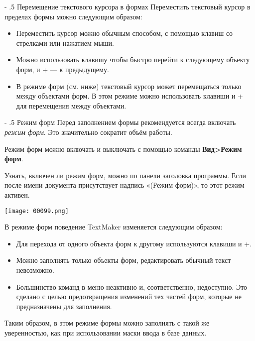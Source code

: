 ﻿\documentclass[a4paper,10pt]{article}
\makeatletter
\renewcommand\paragraph{%
   \@startsection{paragraph}{4}{0mm}%
      {-\baselineskip}%
      {.5\baselineskip}%
      {\normalfont\normalsize\bfseries}}
\makeatother
\begin{document}
\paragraph{Перемещение текстового курсора в формах}
Переместить текстовый курсор в пределах формы можно следующим образом:

\begin{itemize}
 \item Переместить курсор можно обычным способом, с помощью клавиш со стрелками или нажатием мыши.
 \item Можно использовать клавишу  чтобы быстро перейти к следующему объекту форм, и + — к предыдущему.
 \item В режиме форм (см. ниже) текстовый курсор может перемещаться только между объектами форм. В этом режиме можно использовать клавиши  и + для перемещения между объектами.
\end{itemize}

\paragraph{Режим форм}
Перед заполнением формы рекомендуется всегда включать \textit{режим форм}. Это значительно сократит объём работы.

Режим форм можно включать и выключать с помощью команды \textbf{Вид>Режим форм}.

Узнать, включен ли режим форм, можно по панели заголовка программы. Если после имени документа присутствует надпись «(Режим форм)», то этот режим активен.

\texttt{[image: 00099.png]}

В режиме форм поведение TextMaker изменяется следующим образом:
\begin{itemize}
 \item Для перехода от одного объекта форм к другому используются клавиши  и +.
 \item Можно заполнять только объекты форм, редактировать обычный текст невозможно.
 \item Большинство команд в меню неактивно и, соответственно, недоступно. Это сделано с целью предотвращения изменений тех частей форм, которые не предназначены для заполнения.
\end{itemize}

Таким образом, в этом режиме формы можно заполнять с такой же уверенностью, как при использовании маски ввода в базе данных.
\end{document}
